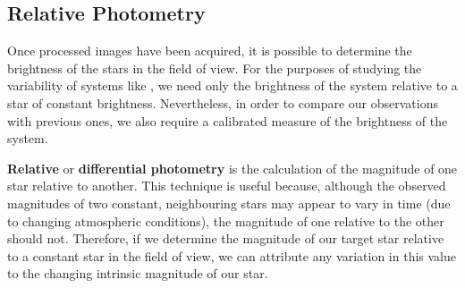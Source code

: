 
\subsection{Relative Photometry}
\label{cha:InfraredDataReductionTechniques:sec:Photometry:subsec:RelativePhotometry}

Once processed images have been acquired, it is possible to determine
the brightness of the stars in the field of view. For
the purposes of studying the variability of systems like \groj,
we need only the brightness of the system relative to a star of
constant brightness. Nevertheless, in order to compare our
observations with previous ones, we also require a calibrated measure
of the brightness of the system. %

\vspace{\myparskip}

\textbf{Relative} or \textbf{differential photometry} %
is the calculation of the magnitude of one star relative to
another. This technique is useful because, although the observed magnitudes of
two constant, neighbouring stars may appear to vary in time (due to
changing atmospheric conditions), the magnitude of one relative to the
other should not. Therefore, if we determine the magnitude of our
target star relative to a constant star in the field of view, we can
attribute any variation in this value to the changing intrinsic magnitude of our star. %

\vspace{\myparskip}


